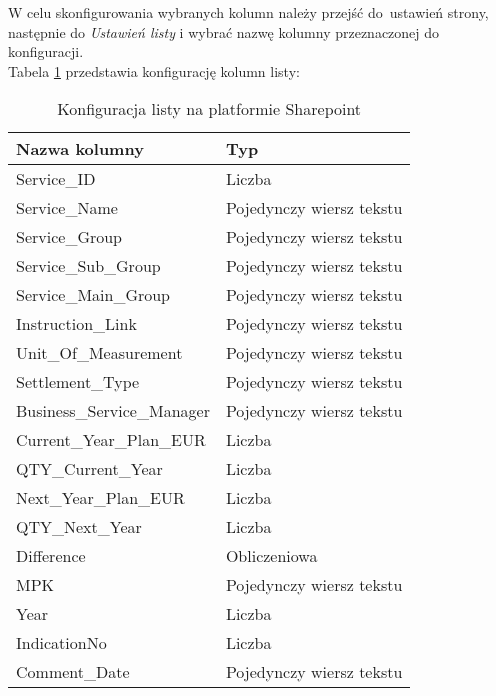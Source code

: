 W celu skonfigurowania wybranych kolumn należy przejść do~ustawień strony, następnie do \emph{Ustawień listy} i wybrać nazwę kolumny przeznaczonej do konfiguracji.\\
Tabela \ref{tab:SharepointList} przedstawia konfigurację kolumn listy:
\begin{table}[h]
    \centering
    \caption{Konfiguracja listy na platformie Sharepoint}
    \label{tab:SharepointList}
    \begin{tabular}{|l|l|}
        \hline
        \textbf{Nazwa kolumny}     & \textbf{Typ}             \\ \hline
        Service\_ID                & Liczba                   \\ \hline
        Service\_Name              & Pojedynczy wiersz tekstu \\ \hline
        Service\_Group             & Pojedynczy wiersz tekstu \\ \hline
        Service\_Sub\_Group        & Pojedynczy wiersz tekstu \\ \hline
        Service\_Main\_Group       & Pojedynczy wiersz tekstu \\ \hline
        Instruction\_Link          & Pojedynczy wiersz tekstu \\ \hline
        Unit\_Of\_Measurement      & Pojedynczy wiersz tekstu \\ \hline
        Settlement\_Type           & Pojedynczy wiersz tekstu \\ \hline
        Business\_Service\_Manager & Pojedynczy wiersz tekstu \\ \hline
        Current\_Year\_Plan\_EUR   & Liczba                   \\ \hline
        QTY\_Current\_Year         & Liczba                   \\ \hline
        Next\_Year\_Plan\_EUR      & Liczba                   \\ \hline
        QTY\_Next\_Year            & Liczba                   \\ \hline
        Difference                 & Obliczeniowa             \\ \hline
        MPK                        & Pojedynczy wiersz tekstu \\ \hline
        Year                       & Liczba                   \\ \hline
        IndicationNo               & Liczba                   \\ \hline
        Comment\_Date              & Pojedynczy wiersz tekstu \\ \hline

\end{tabular}
\end{table}
